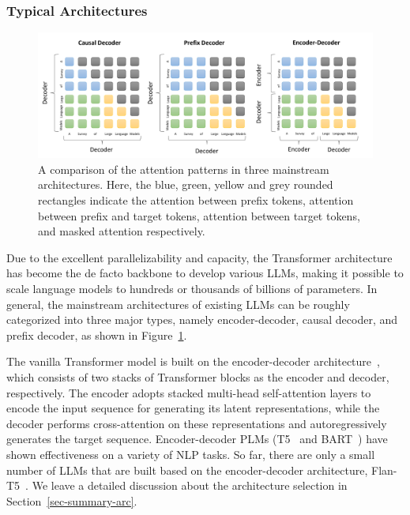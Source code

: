 {\begin{table}[htb]
\begin{tabular}{lcrccccrrrr}
\bottomrule
    \end{tabular}
    
    \label{model_card}
\end{table}



\subsubsection{Typical Architectures}\label{sec:archs}

\begin{figure}[htb]
    \includegraphics[width=\textwidth]{images/architectures.pdf}
    \caption{A comparison of the attention patterns in  three mainstream architectures. Here, the blue, green, yellow and grey rounded rectangles indicate the attention between prefix tokens, attention between prefix and target tokens, attention between target tokens, and masked attention respectively.}
    \label{fig:architectures}
\end{figure}


Due to the excellent parallelizability and capacity, the Transformer architecture~\cite{Vaswani-NIPS-2017-Attention} has become the de facto backbone to develop various LLMs, making it possible to scale language models to hundreds or thousands of billions of parameters.    
In general, the mainstream architectures of existing LLMs can be roughly categorized into three major types, namely encoder-decoder, causal decoder, and prefix decoder, %
as shown in Figure~\ref{fig:architectures}. 

The vanilla Transformer model is built on the encoder-decoder architecture~\cite{Vaswani-NIPS-2017-Attention}, which consists of two stacks of Transformer blocks as the encoder and decoder, respectively. 
The encoder adopts stacked multi-head self-attention layers to encode the input sequence for generating its latent representations, while the decoder performs cross-attention on these representations and autoregressively generates the target sequence. %
Encoder-decoder PLMs (\eg T5~\cite{Raffel-JMLR-2020-Exploring} and BART~\cite{Lewis-ACL-2020-BART}) have shown effectiveness on a variety of NLP tasks.
{
So far, there are only a small number of LLMs that are built based on the encoder-decoder architecture, \eg Flan-T5~\cite{Chung-arxiv-2022-Scaling}. We leave a detailed discussion about the architecture selection  in Section~\ref{sec-summary-arc}.  
}

}
